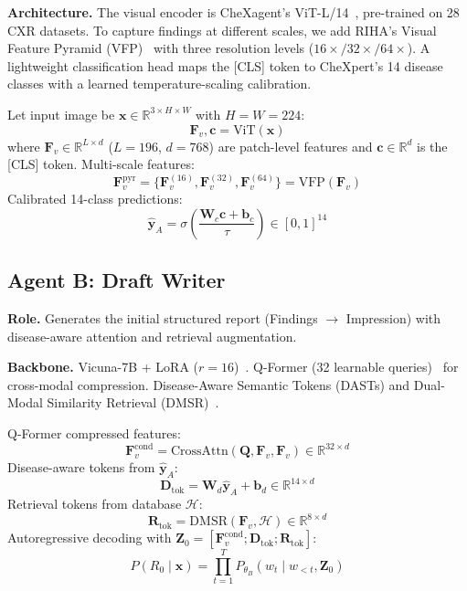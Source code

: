 \documentclass[runningheads,10pt]{llncs}
\newcommand{\Fv}{\mathbf{F}_v}
\newcommand{\yhat}{\hat{\mathbf{y}}}
\begin{document}
\textbf{Architecture.} The visual encoder is CheXagent's ViT-L/14~\cite{chexagent}, pre-trained on 28 CXR datasets. To capture findings at different scales, we add RIHA's Visual Feature Pyramid (VFP)~\cite{riha} with three resolution levels ($16\times/32\times/64\times$). A lightweight classification head maps the [CLS] token to CheXpert's 14 disease classes with a learned temperature-scaling calibration.

Let input image be $\mathbf{x} \in \mathbb{R}^{3 \times H \times W}$ with $H=W=224$:
\begin{equation}
\Fv, \mathbf{c} = \text{ViT}(\mathbf{x}) \label{eq:vit}
\end{equation}
where $\Fv \in \mathbb{R}^{L \times d}$ ($L=196$, $d=768$) are patch-level features and $\mathbf{c} \in \mathbb{R}^{d}$ is the [CLS] token. Multi-scale features:
\begin{equation}
\Fv^{\text{pyr}} = \{ \Fv^{(16)}, \Fv^{(32)}, \Fv^{(64)} \} = \text{VFP}(\Fv) \label{eq:pyramid}
\end{equation}
Calibrated 14-class predictions:
\begin{equation}
\yhat_A = \sigma\!\left( \frac{\mathbf{W}_c \mathbf{c} + \mathbf{b}_c}{\tau} \right) \in [0, 1]^{14} \label{eq:classifier}
\end{equation}

\subsection{Agent B: Draft Writer}

\textbf{Role.} Generates the initial structured report (Findings $\to$ Impression) with disease-aware attention and retrieval augmentation.

\textbf{Backbone.} Vicuna-7B + LoRA ($r=16$)~\cite{radialog}. Q-Former (32 learnable queries)~\cite{chexagent} for cross-modal compression. Disease-Aware Semantic Tokens (DASTs) and Dual-Modal Similarity Retrieval (DMSR)~\cite{diseaseaware}.

Q-Former compressed features:
\begin{equation}
\Fv^{\text{cond}} = \text{CrossAttn}(\mathbf{Q}, \Fv, \Fv) \in \mathbb{R}^{32 \times d} \label{eq:qformer}
\end{equation}
Disease-aware tokens from $\yhat_A$:
\begin{equation}
\mathbf{D}_{\text{tok}} = \mathbf{W}_d \yhat_A + \mathbf{b}_d \in \mathbb{R}^{14 \times d} \label{eq:dast}
\end{equation}
Retrieval tokens from database $\mathcal{H}$:
\begin{equation}
\mathbf{R}_{\text{tok}} = \text{DMSR}(\Fv, \mathcal{H}) \in \mathbb{R}^{8 \times d} \label{eq:dmsr}
\end{equation}
Autoregressive decoding with $\mathbf{Z}_0 = [\Fv^{\text{cond}}; \mathbf{D}_{\text{tok}}; \mathbf{R}_{\text{tok}}]$:
\begin{equation}
P(R_0 \mid \mathbf{x}) = \prod_{t=1}^{T} P_{\theta_B}(w_t \mid w_{<t}, \mathbf{Z}_0) \label{eq:gen}
\end{equation}
\end{document}
